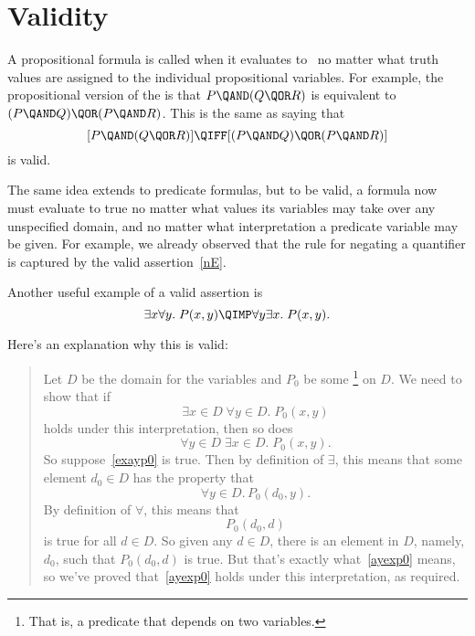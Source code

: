 \iffalse
Logicians have worked very hard to define strict rules for the
use of logic notation so that ideas can be expressed with absolute rigor.
It's all quite charming and clever.  However, the sad irony is that
applied mathematicians usually use their beloved notation as a crude
shorthand, breaking the rules and abusing the notation willy-nilly---sort
of like pounding nails with fine china.
\fi

\section{Validity}

A propositional formula is called  when it evaluates to \true\
no matter what truth values are assigned to the individual propositional
variables.  For example, the propositional version of the 
is that $P \QAND (Q \QOR R)$ is equivalent to $(P \QAND Q) \QOR (P \QAND
R)$.  This is the same as saying that
\[
[P \QAND (Q \QOR R)] \QIFF [(P \QAND Q) \QOR (P \QAND R)]
\]
is valid.

The same idea extends to predicate formulas, but to be valid, a
formula now must evaluate to true no matter what values its variables
may take over any unspecified domain, and no matter what
interpretation a predicate variable may be given.  For example, we
already observed that the rule for negating a quantifier is captured
by the valid assertion~\eqref{nE}.

Another useful example of a valid assertion is
\begin{equation}\label{eaimpliesae}
\exists x \forall y.\; P(x,y) \QIMP \forall y \exists x.\; P(x,y).
\end{equation}

Here's an explanation why this is valid:

\begin{quote}
Let $D$ be the domain for the variables and $P_0$ be some
\footnote{That is, a predicate that depends on two variables.}
on $D$.  We need to show that if
\begin{equation}\label{exayp0}
\exists x \in D\; \forall y \in D.\; P_0(x,y)
\end{equation}
holds under this interpretation, then so does
\begin{equation}\label{ayexp0}
\forall y \in D\; \exists x \in D.\; P_0(x,y).
\end{equation}
So suppose~\eqref{exayp0} is true.  Then by definition of $\exists$, this
means that some element $d_0 \in D$ has the property that
\[
\forall y \in D.\, P_0(d_0, y).
\]
By definition of $\forall$, this means that
\[
P_0(d_0,d)
\]
is true for all $d \in D$.  So given any $d \in D$, there is an element in
$D$, namely, $d_0$, such that $P_0(d_0,d)$ is true.  But that's exactly
what~\eqref{ayexp0} means, so we've proved that~\eqref{ayexp0} holds under
this interpretation, as required.
\end{quote}

